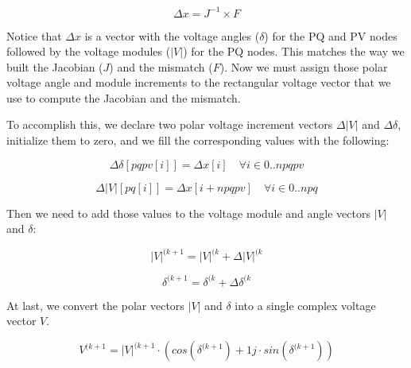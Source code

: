 \documentclass[nols,a4paper,twoside,notoc,fleqn]{tufte-book}
\begin{document}

\begin{equation}
\Delta x = J^{-1} \times F
\label{eq:nr_solve}
\end{equation}

Notice that $\Delta x$ is a vector with the voltage angles ($\delta$) for the PQ and PV nodes followed by the voltage modules ($|V|$) for the PQ nodes. This matches the way we built the Jacobian ($J$) and the mismatch ($F$). Now we must assign those polar voltage angle and module increments to the rectangular voltage vector that we use to compute the Jacobian and the mismatch.

To accomplish this, we declare two polar voltage increment vectors $\Delta |V|$ and $\Delta \delta$, initialize them to zero, and we fill the corresponding values with the following:

\begin{equation}
\Delta \delta[pqpv[i]] = \Delta x[i]  \quad \forall i \in {0..npqpv}
\label{eq:nr_dd1}
\end{equation}

\begin{equation}
\Delta  |V|[pq[i]] = \Delta x[i+npqpv]  \quad \forall i \in {0..npq}
\end{equation}

Then we need to add those values to the voltage module and angle vectors $|V|$ and $\delta$:


\begin{equation}
|V|^{(k+1} = |V|^{(k} + \Delta |V|^{(k}
\end{equation}

\begin{equation}
\delta^{(k+1} = \delta^{(k} + \Delta \delta^{(k}
\end{equation}

At last, we convert the polar vectors  $|V|$ and $\delta$ into a single complex voltage vector $V$.

\begin{equation}
V^{(k+1} = |V|^{(k+1} \cdot \left( cos(\delta^{(k+1}) + 1j \cdot sin(\delta^{(k+1})\right)
\label{eq:nr_voltage_conversion}
\end{equation}
\end{document}
